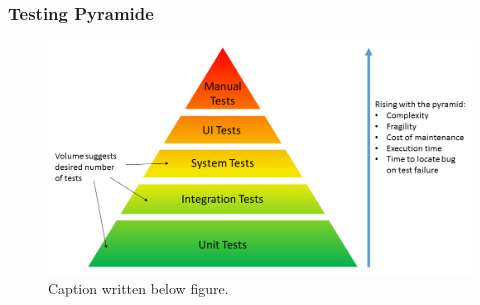\subsubsection{Testing Pyramide}
\begin{figure}[H]
    \centering
    \includegraphics[width=1\textwidth]{Images/test_pyramid.png}
    \caption[Testing Pyramide]{Caption written below figure.}
    \label{fig:flow around cylinder}
\end{figure}
